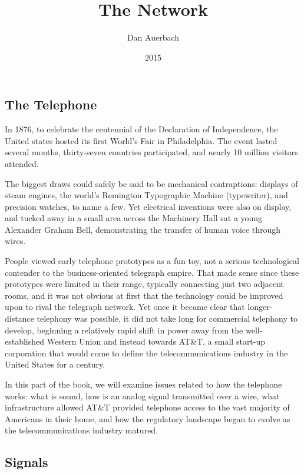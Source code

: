 \documentclass[UTF8]{book}
\begin{document}
\begin{CJK}{UTF8}{gbsn}

\title{The Network}
\author{Dan Auerbach}
\date{2015}
\maketitle

\part{The Telephone}

In 1876, to celebrate the centennial of the Declaration of Independence, the United states hosted its first World's Fair in Philadelphia. The event lasted several months, thirty-seven countries participated, and nearly 10 million visitors attended.

The biggest draws could safely be said to be mechanical contraptions: displays of steam engines, the world's Remington Typographic Machine (typewriter), and precision watches, to name a few. Yet electrical inventions were also on display, and tucked away in a small area across the Machinery Hall sat a young Alexander Graham Bell, demonstrating the transfer of human voice through wires.

People viewed early telephone prototypes as a fun toy, not a serious technological contender to the business-oriented telegraph empire. That made sense since these prototypes were limited in their range, typically connecting just two adjacent rooms, and it was not obvious at first that the technology could be improved upon to rival the telegraph network. Yet once it became clear that longer-distance telephony was possible, it did not take long for commercial telephony to develop, beginning a relatively rapid shift in power away from the well-established Western Union and instead towards AT\&T, a small start-up corporation that would come to define the telecommunications industry in the United States for a century.

In this part of the book, we will examine issues related to how the telephone works: what is sound, how is an analog signal transmitted over a wire, what infrastructure allowed AT\&T provided telephone access to the vast majority of Americans in their home, and how the regulatory landscape began to evolve as the telecommunications industry matured.

\chapter{Signals}


\end{CJK}
\end{document}

